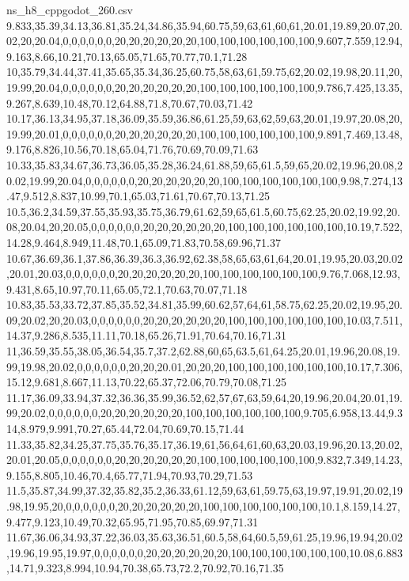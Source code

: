 \begin{filecontents*}[overwrite]{ns_h8_cppgodot_260.csv}
9.833,35.39,34.13,36.81,35.24,34.86,35.94,60.75,59,63,61,60,61,20.01,19.89,20.07,20.02,20,20.04,0,0,0,0,0,0,20,20,20,20,20,20,100,100,100,100,100,100,9.607,7.559,12.94,9.163,8.66,10.21,70.13,65.05,71.65,70.77,70.1,71.28
10,35.79,34.44,37.41,35.65,35.34,36.25,60.75,58,63,61,59.75,62,20.02,19.98,20.11,20,19.99,20.04,0,0,0,0,0,0,20,20,20,20,20,20,100,100,100,100,100,100,9.786,7.425,13.35,9.267,8.639,10.48,70.12,64.88,71.8,70.67,70.03,71.42
10.17,36.13,34.95,37.18,36.09,35.59,36.86,61.25,59,63,62,59,63,20.01,19.97,20.08,20,19.99,20.01,0,0,0,0,0,0,20,20,20,20,20,20,100,100,100,100,100,100,9.891,7.469,13.48,9.176,8.826,10.56,70.18,65.04,71.76,70.69,70.09,71.63
10.33,35.83,34.67,36.73,36.05,35.28,36.24,61.88,59,65,61.5,59,65,20.02,19.96,20.08,20.02,19.99,20.04,0,0,0,0,0,0,20,20,20,20,20,20,100,100,100,100,100,100,9.98,7.274,13.47,9.512,8.837,10.99,70.1,65.03,71.61,70.67,70.13,71.25
10.5,36.2,34.59,37.55,35.93,35.75,36.79,61.62,59,65,61.5,60.75,62.25,20.02,19.92,20.08,20.04,20,20.05,0,0,0,0,0,0,20,20,20,20,20,20,100,100,100,100,100,100,10.19,7.522,14.28,9.464,8.949,11.48,70.1,65.09,71.83,70.58,69.96,71.37
10.67,36.69,36.1,37.86,36.39,36.3,36.92,62.38,58,65,63,61,64,20.01,19.95,20.03,20.02,20.01,20.03,0,0,0,0,0,0,20,20,20,20,20,20,100,100,100,100,100,100,9.76,7.068,12.93,9.431,8.65,10.97,70.11,65.05,72.1,70.63,70.07,71.18
10.83,35.53,33.72,37.85,35.52,34.81,35.99,60.62,57,64,61,58.75,62.25,20.02,19.95,20.09,20.02,20,20.03,0,0,0,0,0,0,20,20,20,20,20,20,100,100,100,100,100,100,10.03,7.511,14.37,9.286,8.535,11.11,70.18,65.26,71.91,70.64,70.16,71.31
11,36.59,35.55,38.05,36.54,35.7,37.2,62.88,60,65,63.5,61,64.25,20.01,19.96,20.08,19.99,19.98,20.02,0,0,0,0,0,0,20,20,20.01,20,20,20,100,100,100,100,100,100,10.17,7.306,15.12,9.681,8.667,11.13,70.22,65.37,72.06,70.79,70.08,71.25
11.17,36.09,33.94,37.32,36.36,35.99,36.52,62,57,67,63,59,64,20,19.96,20.04,20.01,19.99,20.02,0,0,0,0,0,0,20,20,20,20,20,20,100,100,100,100,100,100,9.705,6.958,13.44,9.314,8.979,9.991,70.27,65.44,72.04,70.69,70.15,71.44
11.33,35.82,34.25,37.75,35.76,35.17,36.19,61,56,64,61,60,63,20.03,19.96,20.13,20.02,20.01,20.05,0,0,0,0,0,0,20,20,20,20,20,20,100,100,100,100,100,100,9.832,7.349,14.23,9.155,8.805,10.46,70.4,65.77,71.94,70.93,70.29,71.53
11.5,35.87,34.99,37.32,35.82,35.2,36.33,61.12,59,63,61,59.75,63,19.97,19.91,20.02,19.98,19.95,20,0,0,0,0,0,0,20,20,20,20,20,20,100,100,100,100,100,100,10.1,8.159,14.27,9.477,9.123,10.49,70.32,65.95,71.95,70.85,69.97,71.31
11.67,36.06,34.93,37.22,36.03,35.63,36.51,60.5,58,64,60.5,59,61.25,19.96,19.94,20.02,19.96,19.95,19.97,0,0,0,0,0,0,20,20,20,20,20,20,100,100,100,100,100,100,10.08,6.883,14.71,9.323,8.994,10.94,70.38,65.73,72.2,70.92,70.16,71.35

\end{filecontents*}
